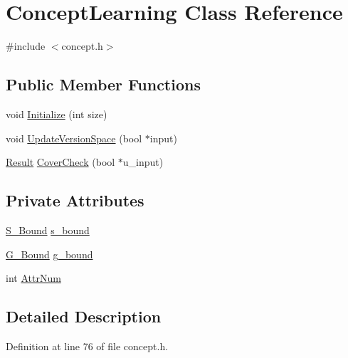 \hypertarget{class_concept_learning}{\section{Concept\-Learning Class Reference}
\label{class_concept_learning}
}


{\ttfamily \#include $<$concept.\-h$>$}

\subsection*{Public Member Functions}
\begin{DoxyCompactItemize}
\item 
void \hyperlink{class_concept_learning_a44745c32a43e09ce1682efdbd29d01f2}{Initialize} (int size)
\item 
void \hyperlink{class_concept_learning_adcdb0df6a5e877769e46c95f40a139c3}{Update\-Version\-Space} (bool $\ast$input)
\item 
\hyperlink{concept_8h_a28287671eaf7406afd604bd055ba4066}{Result} \hyperlink{class_concept_learning_a2c918ff637b1d93e123974eaddd17de0}{Cover\-Check} (bool $\ast$u\-\_\-input)
\end{DoxyCompactItemize}
\subsection*{Private Attributes}
\begin{DoxyCompactItemize}
\item 
\hyperlink{class_s___bound}{S\-\_\-\-Bound} \hyperlink{class_concept_learning_a8ac1de9ab4694d91cffabda42443a96e}{s\-\_\-bound}
\item 
\hyperlink{class_g___bound}{G\-\_\-\-Bound} \hyperlink{class_concept_learning_a449a58ac04e18fd981b2e6bf984fd764}{g\-\_\-bound}
\item 
int \hyperlink{class_concept_learning_ae6bebaccc7f80436856e5ec539feb04c}{Attr\-Num}
\end{DoxyCompactItemize}


\subsection{Detailed Description}


Definition at line 76 of file concept.\-h.



